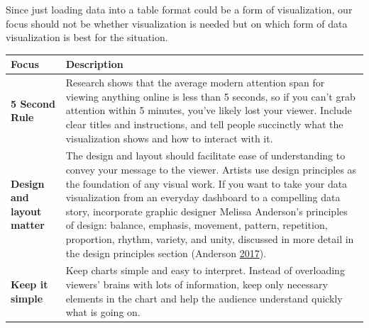 \documentclass[]{book}
\begin{document}
Since just loading data into a table format could be a form of visualization, our focus should not be whether visualization is needed but on which form of data visualization is best for the situation.

\begin{longtable}[]{@{}ll@{}}
\toprule
\begin{minipage}[b]{0.19\columnwidth}\raggedright
\textbf{Focus}\strut
\end{minipage} & \begin{minipage}[b]{0.75\columnwidth}\raggedright
\textbf{Description}\strut
\end{minipage}\tabularnewline
\midrule
\endhead
\begin{minipage}[t]{0.19\columnwidth}\raggedright
\textbf{5 Second Rule}\strut
\end{minipage} & \begin{minipage}[t]{0.75\columnwidth}\raggedright
Research shows that the average modern attention span for viewing anything online is less than 5 seconds, so if you can't grab attention within 5 minutes, you've likely lost your viewer. Include clear titles and instructions, and tell people succinctly what the visualization shows and how to interact with it.\strut
\end{minipage}\tabularnewline
\begin{minipage}[t]{0.19\columnwidth}\raggedright
\textbf{Design and layout matter}\strut
\end{minipage} & \begin{minipage}[t]{0.75\columnwidth}\raggedright
The design and layout should facilitate ease of understanding to convey your message to the viewer. Artists use design principles as the foundation of any visual work. If you want to take your data visualization from an everyday dashboard to a compelling data story, incorporate graphic designer Melissa Anderson's principles of design: balance, emphasis, movement, pattern, repetition, proportion, rhythm, variety, and unity, discussed in more detail in the design principles section (Anderson \protect\hyperlink{ref-design_principles}{2017}).\strut
\end{minipage}\tabularnewline
\begin{minipage}[t]{0.19\columnwidth}\raggedright
\textbf{Keep it simple}\strut
\end{minipage} & \begin{minipage}[t]{0.75\columnwidth}\raggedright
Keep charts simple and easy to interpret. Instead of overloading viewers' brains with lots of information, keep only necessary elements in the chart and help the audience understand quickly what is going on.\strut

\end{minipage}
\end{longtable}
\end{document}
